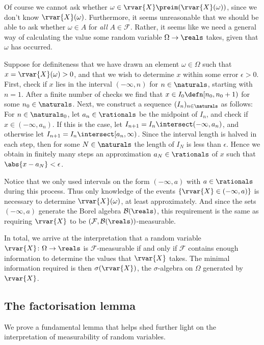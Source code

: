 \documentclass[article, a4paper, 11pt, oneside]{memoir}
\numberwithin{equation}{chapter}
\newcommand{\calB}{\mathcal{B}}
\newcommand{\calF}{\mathcal{F}}
\newcommand{\borel}[1]{\calB(#1)}
\begin{document}
Of course we cannot ask whether $\omega \in \rvar{X}\preim(\rvar{X}(\omega))$, since we don't know $\rvar{X}(\omega)$. Furthermore, it seems unreasonable that we should be able to ask whether $\omega \in A$ for \emph{all} $A \in \calF$. Rather, it seems like we need a general way of calculating the value some random variable $\Omega \to \reals$ takes, given that $\omega$ has occurred.

Suppose for definiteness that we have drawn an element $\omega \in \Omega$ such that $x = \rvar{X}(\omega) > 0$, and that we wish to determine $x$ within some error $\epsilon > 0$. First, check if $x$ lies in the interval $(-\infty,n)$ for $n \in \naturals$, starting with $n = 1$. After a finite number of checks we find that $x \in I_0 \defn [n_0, n_0+1)$ for some $n_0 \in \naturals$. Next, we construct a sequence $(I_n)_{n\in\naturals}$ as follows: For $n \in \naturals_0$, let $a_n \in \rationals$ be the midpoint of $I_n$, and check if $x \in (-\infty, a_n)$. If this is the case, let $I_{n+1} = I_n \intersect (-\infty, a_n)$, and otherwise let $I_{n+1} = I_n \intersect [a_n, \infty)$. Since the interval length is halved in each step, then for some $N \in \naturals$ the length of $I_N$ is less than $\epsilon$. Hence we obtain in finitely many steps an approximation $a_N \in \rationals$ of $x$ such that $\abs{x-a_N} < \epsilon$.

Notice that we only used intervals on the form $(-\infty, a)$ with $a \in \rationals$ during this process. Thus only knowledge of the events $\{\rvar{X} \in (-\infty, a)\}$ is necessary to determine $\rvar{X}(\omega)$, at least approximately. And since the sets $(-\infty, a)$ generate the Borel algebra $\borel{\reals}$, this requirement is the same as requiring $\rvar{X}$ to be $(\calF,\borel{\reals})$-measurable.

In total, we arrive at the interpretation that a random variable $\rvar{X} \colon \Omega \to \reals$ is $\calF$-measurable if and only if $\calF$ contains enough information to determine the values that $\rvar{X}$ takes. The minimal information required is then $\sigma(\rvar{X})$, the $\sigma$-algebra on $\Omega$ generated by $\rvar{X}$.


\subsection{The factorisation lemma}

We prove a fundamental lemma that helps shed further light on the interpretation of measurability of random variables.
\end{document}
